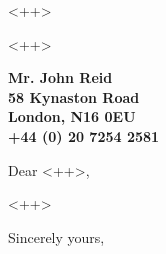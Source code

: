 \documentclass[11pt]{letter} %
\begin{document}
<++>


\begin{letter}{
  <++>
}


\begin{center}
\large\bf Mr. John Reid \\ %
58 Kynaston Road \\ London, N16 0EU \\ +44 (0) 20 7254 2581 %
\end{center}
\vfill

\signature{John Reid} %


\opening{Dear <++>,} 
 
<++>

\closing{Sincerely yours,}




\end{letter}
\end{document}
